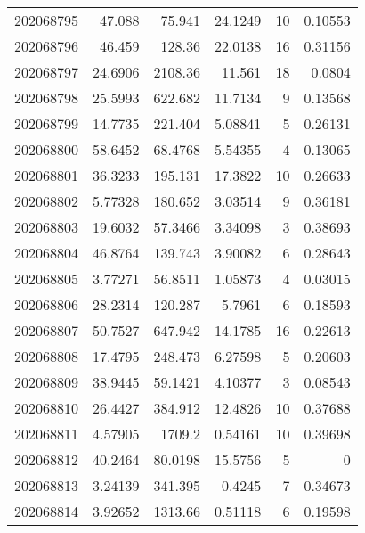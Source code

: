 \begin{tabular}{rrrrrr}
 202068795 &         47.088   &       75.941  &           24.1249  &          10 & 0.10553 \\
 202068796 &         46.459   &      128.36   &           22.0138  &          16 & 0.31156 \\
 202068797 &         24.6906  &     2108.36   &           11.561   &          18 & 0.0804  \\
 202068798 &         25.5993  &      622.682  &           11.7134  &           9 & 0.13568 \\
 202068799 &         14.7735  &      221.404  &            5.08841 &           5 & 0.26131 \\
 202068800 &         58.6452  &       68.4768 &            5.54355 &           4 & 0.13065 \\
 202068801 &         36.3233  &      195.131  &           17.3822  &          10 & 0.26633 \\
 202068802 &          5.77328 &      180.652  &            3.03514 &           9 & 0.36181 \\
 202068803 &         19.6032  &       57.3466 &            3.34098 &           3 & 0.38693 \\
 202068804 &         46.8764  &      139.743  &            3.90082 &           6 & 0.28643 \\
 202068805 &          3.77271 &       56.8511 &            1.05873 &           4 & 0.03015 \\
 202068806 &         28.2314  &      120.287  &            5.7961  &           6 & 0.18593 \\
 202068807 &         50.7527  &      647.942  &           14.1785  &          16 & 0.22613 \\
 202068808 &         17.4795  &      248.473  &            6.27598 &           5 & 0.20603 \\
 202068809 &         38.9445  &       59.1421 &            4.10377 &           3 & 0.08543 \\
 202068810 &         26.4427  &      384.912  &           12.4826  &          10 & 0.37688 \\
 202068811 &          4.57905 &     1709.2    &            0.54161 &          10 & 0.39698 \\
 202068812 &         40.2464  &       80.0198 &           15.5756  &           5 & 0       \\
 202068813 &          3.24139 &      341.395  &            0.4245  &           7 & 0.34673 \\
 202068814 &          3.92652 &     1313.66   &            0.51118 &           6 & 0.19598 \\

\end{tabular}
